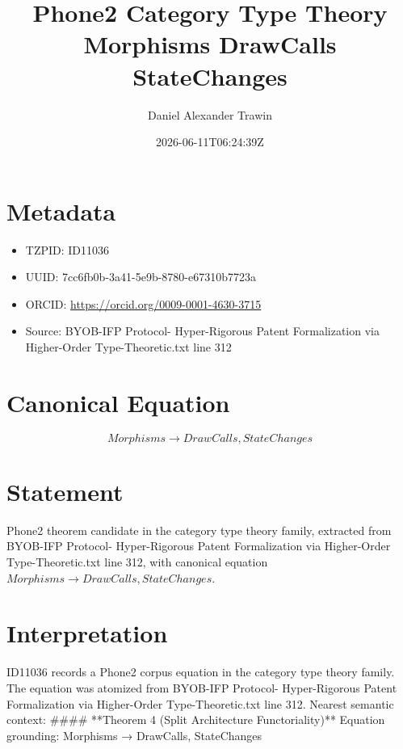 \documentclass[11pt]{article}
\title{Phone2 Category Type Theory Morphisms DrawCalls StateChanges}
\author{Daniel Alexander Trawin}
\date{2026-06-11T06:24:39Z}
\begin{document}
\maketitle
\section*{Metadata}
\begin{itemize}
\item TZPID: ID11036
\item UUID: 7cc6fb0b-3a41-5e9b-8780-e67310b7723a
\item ORCID: \url{https://orcid.org/0009-0001-4630-3715}
\item Source: BYOB-IFP Protocol- Hyper-Rigorous Patent Formalization via Higher-Order Type-Theoretic.txt line 312
\end{itemize}
\section*{Canonical Equation}
\[
Morphisms → {DrawCalls, StateChanges}
\]
\section*{Statement}
Phone2 theorem candidate in the category type theory family, extracted from BYOB-IFP Protocol- Hyper-Rigorous Patent Formalization via Higher-Order Type-Theoretic.txt line 312, with canonical equation $Morphisms → {DrawCalls, StateChanges}$.
\section*{Interpretation}
ID11036 records a Phone2 corpus equation in the category type theory family. The equation was atomized from BYOB-IFP Protocol- Hyper-Rigorous Patent Formalization via Higher-Order Type-Theoretic.txt line 312. Nearest semantic context: #### **Theorem 4 (Split Architecture Functoriality)** Equation grounding: Morphisms → {DrawCalls, StateChanges}
\end{document}
